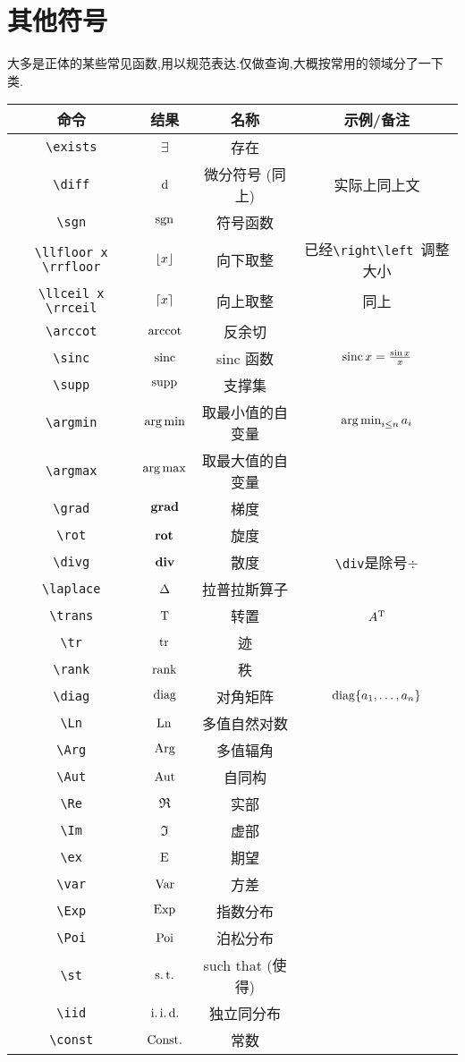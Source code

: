 \documentclass[lang=cn,12pt,scheme=chinese,mode=simple,black]{elegantbook}
\begin{document}
\newpage
\section*{其他符号}
大多是正体的某些常见函数,用以规范表达.仅做查询,大概按常用的领域分了一下类.

\begin{center}
\setlength{\tabcolsep}{10pt}
\begin{tabular}{|c|c|c|c|}
\hline
\textbf{命令} & \textbf{结果} & \textbf{名称} & \textbf{示例/备注}\\
\hline
\verb|\exists| & $\exists$ & 存在 & \\
\verb|\diff| & $\diff$ & 微分符号 (同上) & 实际上同上文\\
\verb|\sgn| & $\sgn$ & 符号函数 & \\
\verb|\llfloor x \rrfloor| & $\llfloor x \rrfloor$ & 向下取整 & 已经\verb|\right\left |调整大小\\
\verb|\llceil x \rrceil| & $\llceil x \rrceil$ & 向上取整 & 同上\\
\verb|\arccot| & $\arccot$ & 反余切 & \\
\verb|\sinc| & $\sinc$ & sinc 函数 & $\sinc x = \frac{\sin x}{x}$\\
\verb|\supp| & $\supp$ & 支撑集 & \\
\verb|\argmin| & $\argmin$ & 取最小值的自变量 & $\argmin_{i \le n} a_i$\\
\verb|\argmax| & $\argmax$ & 取最大值的自变量 & \\
\verb|\grad| & $\grad$ & 梯度 & \\
\verb|\rot| & $\rot$ & 旋度 & \\
\verb|\divg| & $\divg$ & 散度 & \verb|\div|是除号$\div$\\
\verb|\laplace| & $\laplace$ & 拉普拉斯算子 & \\
\verb|\trans| & $\trans$ & 转置 & $A^{\trans}$\\
\verb|\tr| & $\tr$ & 迹 & \\
\verb|\rank| & $\rank$ & 秩 & \\
\verb|\diag| & $\diag$ & 对角矩阵 & $\diag\{a_1,\dots,a_n\}$\\
\verb|\Ln| & $\Ln$ & 多值自然对数 & \\
\verb|\Arg| & $\Arg$ & 多值辐角 & \\
\verb|\Aut| & $\Aut$ & 自同构 & \\
\verb|\Re| & $\Re$ & 实部 & \\
\verb|\Im| & $\Im$ & 虚部 & \\
\verb|\ex| & $\ex$ & 期望 & \\
\verb|\var| & $\var$ & 方差 & \\
\verb|\Exp| & $\Exp$ & 指数分布 & \\
\verb|\Poi| & $\Poi$ & 泊松分布 & \\
\verb|\st| & $\st$ & such that (使得) & \\
\verb|\iid| & $\iid$ & 独立同分布 & \\
\verb|\const| & $\const$ & 常数 & \\
\hline
\end{tabular}
\end{center}
\end{document}
